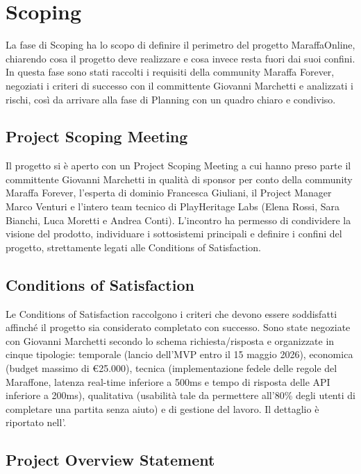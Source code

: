 \chapter{Scoping}

La fase di Scoping ha lo scopo di definire il perimetro del progetto MaraffaOnline, chiarendo cosa il progetto deve realizzare e cosa invece resta fuori dai suoi confini. In questa fase sono stati raccolti i requisiti della community Maraffa Forever, negoziati i criteri di successo con il committente Giovanni Marchetti e analizzati i rischi, così da arrivare alla fase di Planning con un quadro chiaro e condiviso.

\section{Project Scoping Meeting}

Il progetto si è aperto con un Project Scoping Meeting a cui hanno preso parte il committente Giovanni Marchetti in qualità di sponsor per conto della community Maraffa Forever, l'esperta di dominio Francesca Giuliani, il Project Manager Marco Venturi e l'intero team tecnico di PlayHeritage Labs (Elena Rossi, Sara Bianchi, Luca Moretti e Andrea Conti). L'incontro ha permesso di condividere la visione del prodotto, individuare i sottosistemi principali e definire i confini del progetto, strettamente legati alle Conditions of Satisfaction.

\section{Conditions of Satisfaction}

Le Conditions of Satisfaction raccolgono i criteri che devono essere soddisfatti affinché il progetto sia considerato completato con successo. Sono state negoziate con Giovanni Marchetti secondo lo schema richiesta/risposta e organizzate in cinque tipologie: temporale (lancio dell'MVP entro il 15 maggio 2026), economica (budget massimo di €25.000), tecnica (implementazione fedele delle regole del Maraffone, latenza real-time inferiore a 500ms e tempo di risposta delle API inferiore a 200ms), qualitativa (usabilità tale da permettere all'80\% degli utenti di completare una partita senza aiuto) e di gestione del lavoro. Il dettaglio è riportato nell'.

\section{Project Overview Statement}

